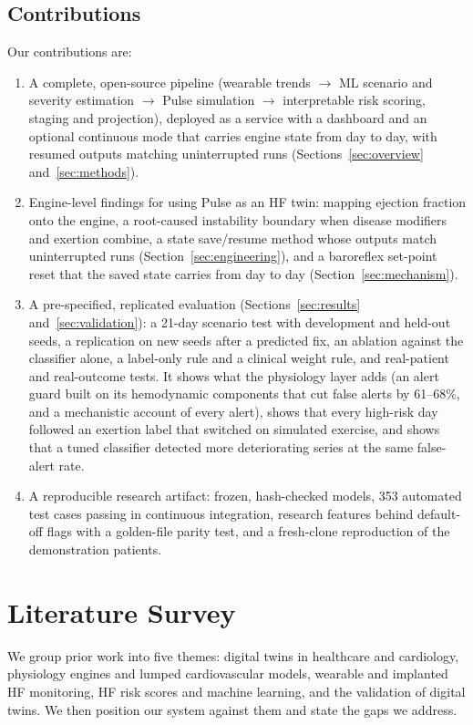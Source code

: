 \documentclass[conference]{IEEEtran}
\begin{document}
\subsection{Contributions}
Our contributions are:
\begin{enumerate}
\item A complete, open-source pipeline (wearable trends $\rightarrow$ ML scenario and severity estimation $\rightarrow$ Pulse simulation $\rightarrow$ interpretable risk scoring, staging and projection), deployed as a service with a dashboard and an optional continuous mode that carries engine state from day to day, with resumed outputs matching uninterrupted runs (Sections~\ref{sec:overview} and~\ref{sec:methods}).
\item Engine-level findings for using Pulse as an HF twin: mapping ejection fraction onto the engine, a root-caused instability boundary when disease modifiers and exertion combine, a state save/resume method whose outputs match uninterrupted runs (Section~\ref{sec:engineering}), and a baroreflex set-point reset that the saved state carries from day to day (Section~\ref{sec:mechanism}).
\item A pre-specified, replicated evaluation (Sections~\ref{sec:results} and~\ref{sec:validation}): a 21-day scenario test with development and held-out seeds, a replication on new seeds after a predicted fix, an ablation against the classifier alone, a label-only rule and a clinical weight rule, and real-patient and real-outcome tests. It shows what the physiology layer adds (an alert guard built on its hemodynamic components that cut false alerts by 61--68\%, and a mechanistic account of every alert), shows that every high-risk day followed an exertion label that switched on simulated exercise, and shows that a tuned classifier detected more deteriorating series at the same false-alert rate.
\item A reproducible research artifact: frozen, hash-checked models, 353 automated test cases passing in continuous integration, research features behind default-off flags with a golden-file parity test, and a fresh-clone reproduction of the demonstration patients.
\end{enumerate}

\section{Literature Survey}\label{sec:related}
We group prior work into five themes: digital twins in healthcare and cardiology, physiology engines and lumped cardiovascular models, wearable and implanted HF monitoring, HF risk scores and machine learning, and the validation of digital twins. We then position our system against them and state the gaps we address.
\end{document}
